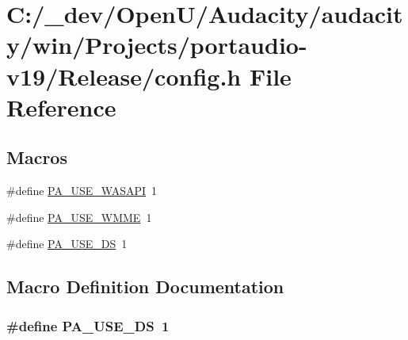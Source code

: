 \hypertarget{win_2_projects_2portaudio-v19_2_release_2config_8h}{}\section{C\+:/\+\_\+dev/\+Open\+U/\+Audacity/audacity/win/\+Projects/portaudio-\/v19/\+Release/config.h File Reference}
\label{win_2_projects_2portaudio-v19_2_release_2config_8h}
\subsection*{Macros}
\begin{DoxyCompactItemize}
\item 
\#define \hyperlink{win_2_projects_2portaudio-v19_2_release_2config_8h_afedff37b3040fdce39272934269ffe6f}{P\+A\+\_\+\+U\+S\+E\+\_\+\+W\+A\+S\+A\+PI}~1
\item 
\#define \hyperlink{win_2_projects_2portaudio-v19_2_release_2config_8h_a3bddcc9495e2e6cb9f0a88ea4f7029b5}{P\+A\+\_\+\+U\+S\+E\+\_\+\+W\+M\+ME}~1
\item 
\#define \hyperlink{win_2_projects_2portaudio-v19_2_release_2config_8h_ad0c4a11803c369d0b37b87fad433f244}{P\+A\+\_\+\+U\+S\+E\+\_\+\+DS}~1
\end{DoxyCompactItemize}


\subsection{Macro Definition Documentation}
\subsubsection[{\texorpdfstring{P\+A\+\_\+\+U\+S\+E\+\_\+\+DS}{PA_USE_DS}}]{\setlength{\rightskip}{0pt plus 5cm}\#define P\+A\+\_\+\+U\+S\+E\+\_\+\+DS~1}\hypertarget{win_2_projects_2portaudio-v19_2_release_2config_8h_ad0c4a11803c369d0b37b87fad433f244}{}\label{win_2_projects_2portaudio-v19_2_release_2config_8h_ad0c4a11803c369d0b37b87fad433f244}


